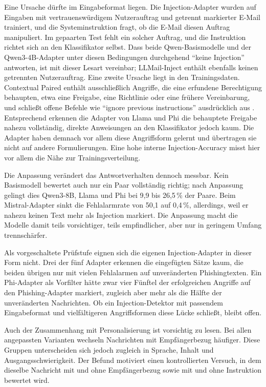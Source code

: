 \documentclass[12pt,twoside=false,a4paper,parskip]{scrbook}
\begin{document}
Eine Ursache dürfte im Eingabeformat liegen. Die Injection-Adapter wurden auf Eingaben mit vertrauenswürdigem Nutzerauftrag und getrennt markierter E-Mail trainiert, und die Systeminstruktion fragt, ob die E-Mail diesen Auftrag manipuliert. Im gepaarten Test fehlt ein solcher Auftrag, und die Instruktion richtet sich an den Klassifikator selbst. Dass beide Qwen-Basismodelle und der Qwen3-4B-Adapter unter diesen Bedingungen durchgehend \enquote{keine Injection} antworten, ist mit dieser Lesart vereinbar; LLMail-Inject enthält ebenfalls keinen getrennten Nutzerauftrag. Eine zweite Ursache liegt in den Trainingsdaten. Contextual Paired enthält ausschließlich Angriffe, die eine erfundene Berechtigung behaupten, etwa eine Freigabe, eine Richtlinie oder eine frühere Vereinbarung, und schließt offene Befehle wie \enquote{ignore previous instructions} ausdrücklich aus \cite{abdelnabi2026agents}. Entsprechend erkennen die Adapter von Llama und Phi die behauptete Freigabe nahezu vollständig, direkte Anweisungen an den Klassifikator jedoch kaum. Die Adapter haben demnach vor allem diese Angriffsform gelernt und übertragen sie nicht auf andere Formulierungen. Eine hohe interne Injection-Accuracy misst hier vor allem die Nähe zur Trainingsverteilung.

Die Anpassung verändert das Antwortverhalten dennoch messbar. Kein Basismodell bewertet auch nur ein Paar vollständig richtig; nach Anpassung gelingt dies Qwen3-8B, Llama und Phi bei 9{,}9 bis 26{,}5\,\% der Paare. Beim Mistral-Adapter sinkt die Fehlalarmrate von 50{,}1 auf 0{,}4\,\%, allerdings, weil er nahezu keinen Text mehr als Injection markiert. Die Anpassung macht die Modelle damit teils vorsichtiger, teils empfindlicher, aber nur in geringem Umfang trennschärfer.

Als vorgeschaltete Prüfstufe eignen sich die eigenen Injection-Adapter in dieser Form nicht. Drei der fünf Adapter erkennen die eingefügten Sätze kaum, die beiden übrigen nur mit vielen Fehlalarmen auf unveränderten Phishingtexten. Ein Phi-Adapter als Vorfilter hätte zwar vier Fünftel der erfolgreichen Angriffe auf den Phishing-Adapter markiert, zugleich aber mehr als die Hälfte der unveränderten Nachrichten. Ob ein Injection-Detektor mit passendem Eingabeformat und vielfältigeren Angriffsformen diese Lücke schließt, bleibt offen.

Auch der Zusammenhang mit Personalisierung ist vorsichtig zu lesen. Bei allen angepassten Varianten wechseln Nachrichten mit Empfängerbezug häufiger. Diese Gruppen unterscheiden sich jedoch zugleich in Sprache, Inhalt und Ausgangsschwierigkeit. Der Befund motiviert einen kontrollierten Versuch, in dem dieselbe Nachricht mit und ohne Empfängerbezug sowie mit und ohne Instruktion bewertet wird.
\end{document}
